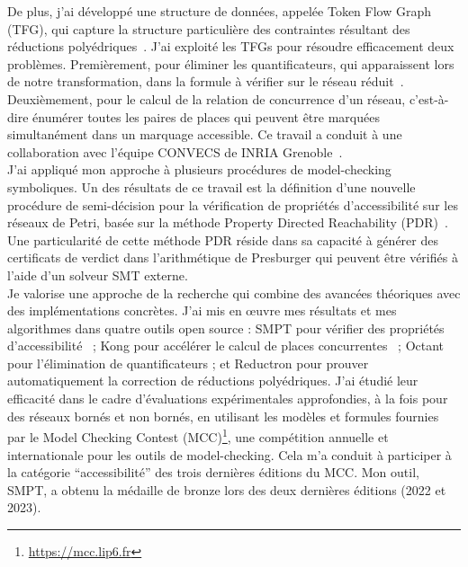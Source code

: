 De plus, j'ai développé une structure de données, appelée Token Flow Graph
(TFG), qui capture la structure particulière des contraintes résultant des
réductions polyédriques~\cite{amat_accelerating_2021,amat_leveraging_2022}. J'ai exploité les TFGs
pour résoudre efficacement deux problèmes. Premièrement, pour éliminer les
quantificateurs, qui apparaissent lors de notre transformation, dans la formule
à vérifier sur le réseau réduit~\cite{amat_project_2024}. Deuxièmement, pour le
calcul de la relation de concurrence d'un réseau, c'est-à-dire énumérer toutes
les paires de places qui peuvent être marquées simultanément dans un marquage
accessible. Ce travail a conduit à une collaboration avec l'équipe CONVECS de
INRIA Grenoble~\cite{amat_toolchain_2023}.\\

J'ai appliqué mon approche à plusieurs procédures de model-checking symboliques.
Un des résultats de ce travail est la définition d'une nouvelle procédure de
semi-décision pour la vérification de propriétés d'accessibilité sur les réseaux
de Petri, basée sur la méthode Property Directed Reachability
(PDR)~\cite{amat_property_2022}. Une particularité de cette méthode PDR réside
dans sa capacité à générer des certificats de verdict dans l'arithmétique de
Presburger qui peuvent être vérifiés à l'aide d'un solveur SMT externe.\\

Je valorise une approche de la recherche qui combine des avancées théoriques avec
des implémentations concrètes. J'ai mis en œuvre mes résultats et mes algorithmes
dans quatre outils open source : \textsf{SMPT} pour vérifier des propriétés
d'accessibilité~\cite{amat_smpt_2023} ; \textsf{Kong} pour accélérer le calcul de places concurrentes~\cite{amat_kong_2022}
; \textsf{Octant} pour l'élimination de quantificateurs ; et \textsf{Reductron} pour
prouver automatiquement la correction de réductions polyédriques. J'ai étudié
leur efficacité dans le cadre d'évaluations expérimentales approfondies, à la
fois pour des réseaux bornés et non bornés, en utilisant les modèles et formules
fournies par le Model Checking Contest
(MCC)\footnote{\url{https://mcc.lip6.fr}}, une compétition annuelle et
internationale pour les outils de model-checking. Cela m'a conduit à participer
à la catégorie ``accessibilité'' des trois dernières éditions du MCC. Mon outil,
\textsf{SMPT}, a obtenu la médaille de bronze lors des deux dernières éditions
(2022 et 2023).

\vspace{10pt}

